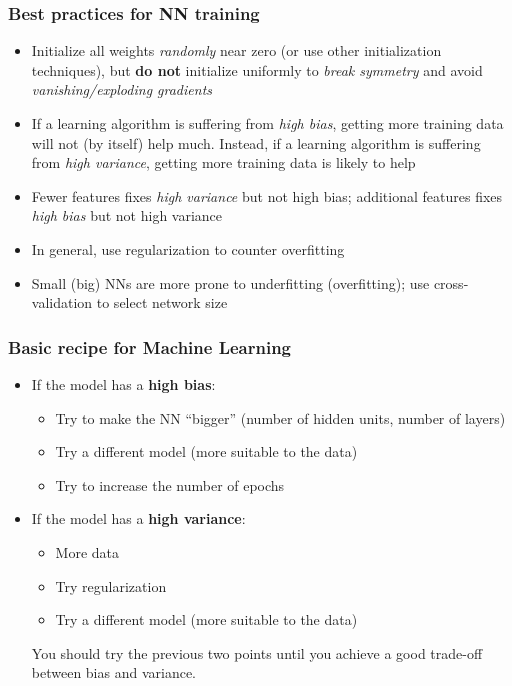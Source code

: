 \documentclass{beamer}
\begin{document}
	\begin{frame}
		\frametitle{Best practices for NN training}
		\begin{itemize}
			\item Initialize all weights \textit{randomly} near zero (or use other initialization techniques), but \textbf{do not} initialize uniformly to \textit{break symmetry} and avoid \textit{vanishing/exploding gradients}
			\item If a learning algorithm is suffering from \textit{high bias}, getting more training data will not (by itself) help much. Instead, if a learning algorithm is suffering from \textit{high variance}, getting more training data is likely to help
			\item Fewer features fixes \textit{high variance} but not high bias; additional features fixes \textit{high bias} but not high variance
			\item In general, use regularization to counter overfitting
			\item Small (big) NNs are more prone to underfitting (overfitting); use cross-validation to select network size
		\end{itemize}
	\end{frame}
	
	\begin{frame}
		\frametitle{Basic recipe for Machine Learning}
		\begin{itemize}
			\item If the model has a \textbf{high bias}:
			\begin{itemize}
				\item Try to make the NN ``bigger'' (number of hidden units, number of layers)
				\item Try a different model (more suitable to the data)
				\item Try to increase the number of epochs
			\end{itemize}
			\item If the model has a \textbf{high variance}:
			\begin{itemize}
				\item More data
				\item Try regularization
				\item Try a different model (more suitable to the data)
			\end{itemize}
			You should try the previous two points until you achieve a good trade-off between bias and variance.
		\end{itemize}
	\end{frame}
		
\end{document}
